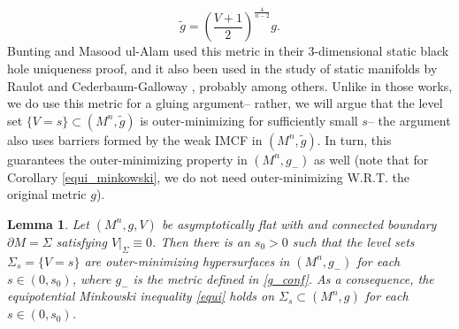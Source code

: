 \documentclass[12pt,twoside]{article}
\theoremstyle{plain}
\newtheorem{lemma}[theorem]{Lemma}
\theoremstyle{definition}
\theoremstyle{remark}
\numberwithin{equation}{section}
\begin{document}
\begin{equation} \label{g_conf2}
\widetilde{g} = \left( \frac{V+1}{2} \right)^{\frac{4}{n-2}} g.
\end{equation}
Bunting and Masood ul-Alam \cite{BMA} used this metric in their $3$-dimensional static black hole uniqueness proof, and it also been used in the study of static manifolds by Raulot \cite{Rau} and Cederbaum-Galloway \cite{photon_sphere_positive_mass}, probably among others. Unlike in those works, we do  use this metric for a gluing argument-- rather, we will argue that the level set $\{ V =s \} \subset (M^{n},\widetilde{g})$ is outer-minimizing for sufficiently small $s$-- the argument also uses barriers formed by the weak IMCF in $(M^{n},\widetilde{g})$. In turn, this guarantees the outer-minimizing property in $(M^{n},g_{-})$ as well (note that for Corollary \ref{equi_minkowski}, we do not need outer-minimizing W.R.T. the original metric $g$).
\begin{lemma}
Let $(M^{n},g,V)$ be asymptotically flat with and connected boundary $\partial M=\Sigma$ satisfying $V|_{\Sigma} \equiv 0$. Then there is an $s_{0} > 0$ such that the level sets $\Sigma_{s}= \{ V = s\}$ are outer-minimizing hypersurfaces in $(M^{n},g_{-})$ for each $s \in (0,s_{0})$, where $g_{-}$ is the metric defined in \eqref{g_conf}. As a consequence, the equipotential Minkowski inequality \eqref{equi} holds on $\Sigma_{s} \subset (M^{n},g)$ for each $s \in (0,s_{0})$.
\end{lemma}
\end{document}

